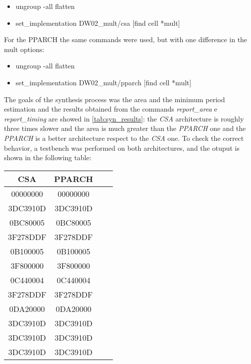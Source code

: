 \begin{itemize}
\item ungroup -all flatten
\item set\_implementation DW02\_mult/csa [find cell *mult] 
\end{itemize}
For the PPARCH the same commands were used, but with one difference in the mult options:
\begin{itemize}
\item ungroup -all flatten
\item set\_implementation DW02\_mult/pparch [find cell *mult] 
\end{itemize}
The goals of the synthesis process was the area and the minimum period estimation and the results obtained from the commands \textit{report\_area} e \textit{report\_timing} are showed in \autoref{tab:syn_results}: the \textit{CSA} architecture is roughly three times slower and the area is much greater than the \textit{PPARCH} one and the \textit{PPARCH} is a better architecture respect to the \textit{CSA} one.
To check the correct behavior, a testbench was performed on both architectures, and the otuput is shown in the following table:

\begin{table}[H]
\begin{center}
\begin{tabular}{|c|c|c|c|}				\hline
CSA		 	  & PPARCH 					\\ \hline
00000000   	  & 00000000               	\\ \hline
3DC3910D      & 3DC3910D                \\ \hline
0BC80005      & 0BC80005                \\ \hline
3F278DDF      & 3F278DDF                \\ \hline
0B100005      & 0B100005                  \\ \hline
3F800000      & 3F800000              \\ \hline
0C440004      & 0C440004                 \\ \hline
3F278DDF      & 3F278DDF                 \\ \hline
0DA20000      & 0DA20000                   \\ \hline
3DC3910D      & 3DC3910D                 \\ \hline
3DC3910D      & 3DC3910D                   \\ \hline
3DC3910D      & 3DC3910D                   \\ \hline
\end{tabular}
\end{center}
\end{table}

